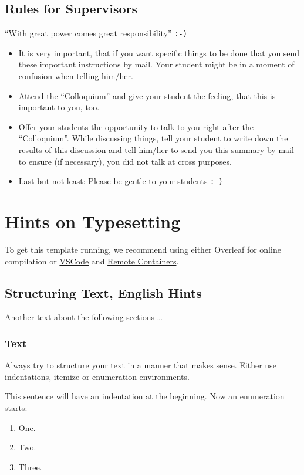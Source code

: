 \subsection{Rules for Supervisors}
\enquote{With great power comes great responsibility} \texttt{:-)}

\begin{itemize}
\item It is very important, that if you want specific things to be done that you send these important instructions by mail. Your student might be in a moment of confusion when telling him/her.
\item Attend the \enquote{Colloquium} and give your student the feeling, that this is important to you, too.
\item Offer your students the opportunity to talk to you right after the \enquote{Colloquium}. While discussing things, tell your student to write down the results of this discussion and tell him/her to send you this summary by mail to ensure (if necessary), you did not talk at cross purposes.
\item Last but not least: Please be gentle to your students \texttt{:-)}
\end{itemize}

\section{Hints on Typesetting}
To get this template running, we recommend using either Overleaf for online compilation or  \href{https://code.visualstudio.com/download}{VSCode} and \href{https://code.visualstudio.com/docs/devcontainers/tutorial}{Remote Containers}.

\subsection{Structuring Text, English Hints}
Another text about the following sections \dots

\subsubsection{Text }
Always try to structure your text in a manner that makes sense. Either use indentations, itemize or enumeration environments.

This sentence will have an indentation at the beginning. Now an enumeration starts:

\begin{enumerate}
\item One.
\item Two.
\item Three.
\end{enumerate}

